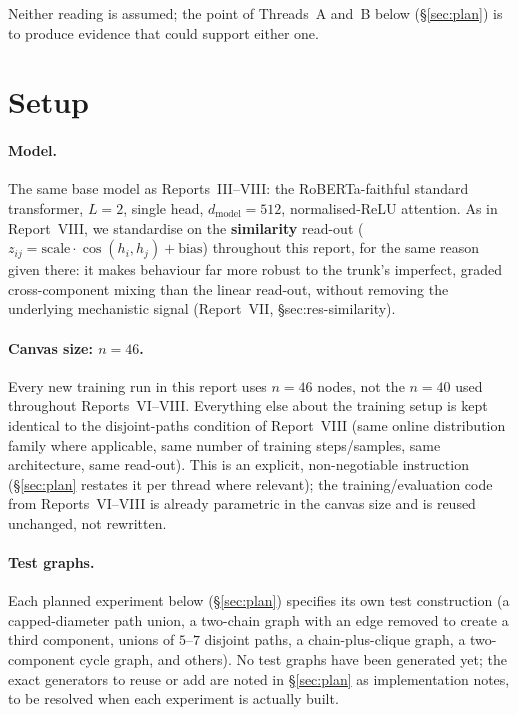 \documentclass[11pt,a4paper]{article}
\begin{document}
Neither reading is assumed; the point of Threads~A and~B below (\S\ref{sec:plan}) is to produce
evidence that could support either one.

\section{Setup}
\label{sec:setup}

\paragraph{Model.} The same base model as Reports~III--VIII: the RoBERTa-faithful standard
transformer, $L=2$, single head, $d_{\mathrm{model}}=512$, normalised-ReLU attention. As in
Report~VIII, we standardise on the \textbf{similarity} read-out
($z_{ij}=\mathrm{scale}\cdot\cos(h_i,h_j)+\mathrm{bias}$) throughout this report, for the same
reason given there: it makes behaviour far more robust to the trunk's imperfect, graded
cross-component mixing than the linear read-out, without removing the underlying mechanistic
signal (Report~VII, \S sec:res-similarity).

\paragraph{Canvas size: $n=46$.} Every new training run in this report uses $n=46$ nodes, not
the $n=40$ used throughout Reports~VI--VIII. Everything else about the training setup is kept
identical to the disjoint-paths condition of Report~VIII (same online distribution family
where applicable, same number of training steps/samples, same architecture, same read-out).
This is an explicit, non-negotiable instruction (\S\ref{sec:plan} restates it per thread where
relevant); the training/evaluation code from Reports~VI--VIII is already parametric in the
canvas size and is reused unchanged, not rewritten.

\paragraph{Test graphs.} Each planned experiment below (\S\ref{sec:plan}) specifies its own
test construction (a capped-diameter path union, a two-chain graph with an edge removed to
create a third component, unions of $5$--$7$ disjoint paths, a chain-plus-clique graph, a
two-component cycle graph, and others). No test graphs have been generated yet; the exact
generators to reuse or add are noted in \S\ref{sec:plan} as implementation notes, to be
resolved when each experiment is actually built.
\end{document}
